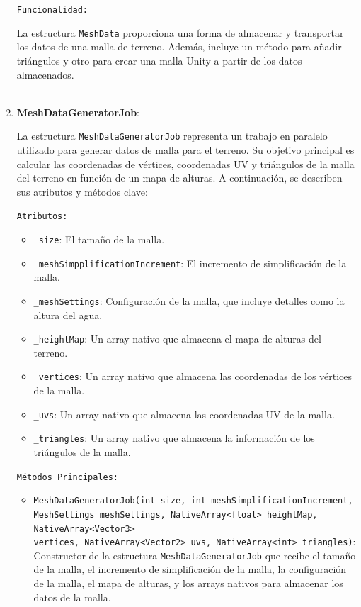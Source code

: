 \begin{enumerate}
    \texttt{Funcionalidad:}

    La estructura \texttt{MeshData} proporciona una forma de almacenar y transportar los datos de una malla de terreno. Además, incluye un método para añadir triángulos y otro para crear una malla Unity a partir de los datos almacenados.\\
    \\

    \item \textbf{MeshDataGeneratorJob}:

    La estructura \texttt{MeshDataGeneratorJob} representa un trabajo en paralelo utilizado para generar datos de malla para el terreno. Su objetivo principal es calcular las coordenadas de vértices, coordenadas UV y triángulos de la malla del terreno en función de un mapa de alturas. A continuación, se describen sus atributos y métodos clave:

    \texttt{Atributos:}

    \begin{itemize}
        \item \texttt{\_size}: El tamaño de la malla.
        \item \texttt{\_meshSimpplificationIncrement}: El incremento de simplificación de la malla.
        \item \texttt{\_meshSettings}: Configuración de la malla, que incluye detalles como la altura del agua.
        \item \texttt{\_heightMap}: Un array nativo que almacena el mapa de alturas del terreno.
        \item \texttt{\_vertices}: Un array nativo que almacena las coordenadas de los vértices de la malla.
        \item \texttt{\_uvs}: Un array nativo que almacena las coordenadas UV de la malla.
        \item \texttt{\_triangles}: Un array nativo que almacena la información de los triángulos de la malla.
    \end{itemize}

    \texttt{Métodos Principales:}

    \begin{itemize}
        \item \texttt{MeshDataGeneratorJob(int size, int meshSimplificationIncrement, \\MeshSettings meshSettings, NativeArray<float> heightMap, NativeArray<Vector3> \\vertices, NativeArray<Vector2> uvs, NativeArray<int> triangles)}: Constructor de la estructura \texttt{MeshDataGeneratorJob} que recibe el tamaño de la malla, el incremento de simplificación de la malla, la configuración de la malla, el mapa de alturas, y los arrays nativos para almacenar los datos de la malla.


\end{itemize}
\end{enumerate}
